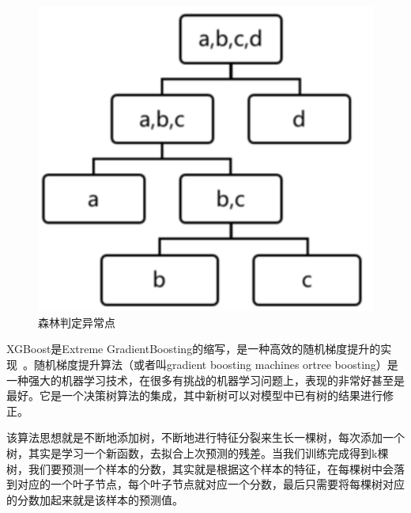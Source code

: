 \begin{figure}[htbp]
  \centering
  \includegraphics[scale=0.8]{figure/chapter4/森林判定异常点.png}
  \caption{森林判定异常点}\label{senlinpanding}
\end{figure}

XGBoost是Extreme GradientBoosting的缩写，是一种高效的随机梯度提升的实现~\cite{赵洪山2019应用深度自编码网络和}。随机梯度提升算法（或者叫gradient boosting machines ortree boosting）是一种强大的机器学习技术，在很多有挑战的机器学习问题上，表现的非常好甚至是最好。它是一个决策树算法的集成，其中新树可以对模型中已有树的结果进行修正。

该算法思想就是不断地添加树，不断地进行特征分裂来生长一棵树，每次添加一个树，其实是学习一个新函数，去拟合上次预测的残差。当我们训练完成得到k棵树，我们要预测一个样本的分数，其实就是根据这个样本的特征，在每棵树中会落到对应的一个叶子节点，每个叶子节点就对应一个分数，最后只需要将每棵树对应的分数加起来就是该样本的预测值。

